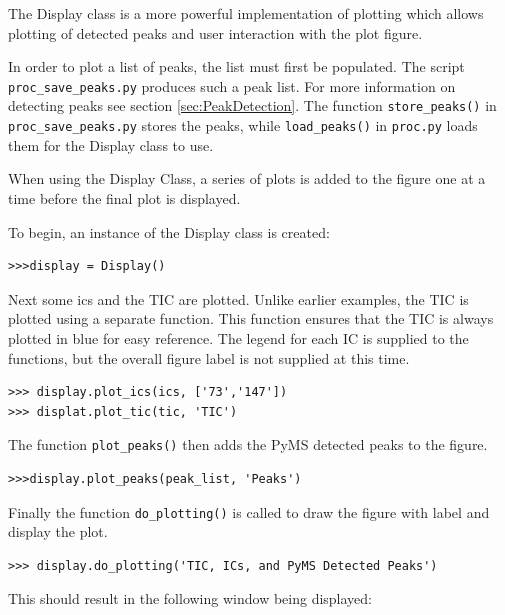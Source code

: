 
The Display class is a more powerful implementation of plotting which 
allows plotting of detected peaks and user interaction with the plot figure.



In order to plot a list of peaks, the list must first be populated.
The script {\tt proc\_save\_peaks.py} produces such a peak list. For more information
on detecting peaks see section \ref{sec:PeakDetection}. The function 
{\tt store\_peaks()} in {\tt proc\_save\_peaks.py} stores the peaks, while
{\tt load\_peaks()} in {\tt proc.py} loads them for the Display class to use.

When using the Display Class, a series of plots is added to the figure
one at a time before the final plot is displayed.

To begin, an instance of the Display class is created:

\begin{verbatim}
>>>display = Display()
\end{verbatim}

Next some ics and the TIC are plotted. Unlike earlier examples, the TIC is
plotted using a separate function. This function ensures that the TIC is always
plotted in blue for easy reference. The legend for each IC is supplied to the
functions, but the overall figure label is not supplied at this time.

\begin{verbatim}
>>> display.plot_ics(ics, ['73','147'])
>>> displat.plot_tic(tic, 'TIC')
\end{verbatim}

The function {\tt plot\_peaks()} then adds the PyMS detected peaks to the figure.

\begin{verbatim}
>>>display.plot_peaks(peak_list, 'Peaks')
\end{verbatim}

Finally the function {\tt do\_plotting()} is called to draw the figure with 
label and display the plot.

\begin{verbatim}
>>> display.do_plotting('TIC, ICs, and PyMS Detected Peaks')
\end{verbatim}

This should result in the following window being displayed:

